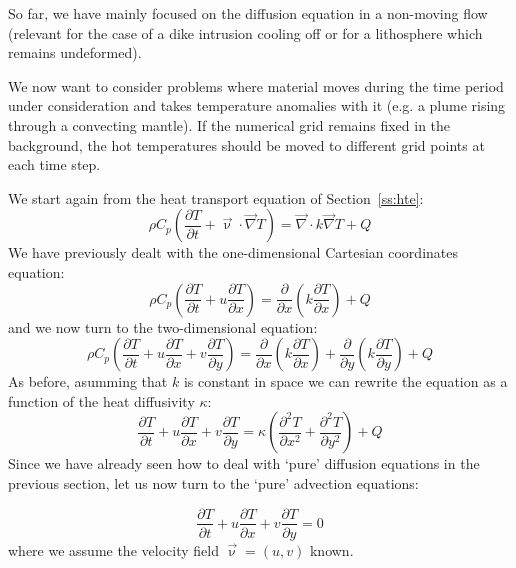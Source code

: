 
So far, we have mainly focused on the diffusion equation in a non-moving flow 
(relevant for the case of a dike intrusion cooling off 
or for a lithosphere which remains undeformed). 

We now want to consider problems where material moves during the time period under 
consideration and takes temperature anomalies with it (e.g. a plume rising 
through a convecting mantle). 
If the numerical grid remains fixed in the background, the hot temperatures should 
be moved to different grid points at each time step. 

We start again from the heat transport equation of Section~\ref{ss:hte}:
\begin{equation}
\rho C_p \left( \frac{\partial T}{\partial t} + \vec\upnu \cdot \vec\nabla T  \right)=
\vec\nabla \cdot k \vec\nabla T + Q 
\end{equation}
We have previously dealt with the one-dimensional Cartesian coordinates equation:
\begin{equation}
\rho C_p \left( \frac{\partial T}{\partial t}  
+ u \frac{\partial T}{\partial x} \right)= 
\frac{\partial }{\partial x} \left(  k  \frac{\partial T}{\partial x} \right)+ Q
\end{equation}
and we now turn to the two-dimensional equation:
\begin{equation}
\rho C_p \left( \frac{\partial T}{\partial t}   
+ u \frac{\partial T}{\partial x}  
+ v \frac{\partial T}{\partial y} \right) 
=
\frac{\partial }{\partial x} \left(  k  \frac{\partial T}{\partial x} \right)
+
\frac{\partial }{\partial y} \left(  k  \frac{\partial T}{\partial y} \right)
+Q
\end{equation}
As before, asumming that $k$ is constant in space we can rewrite the equation as 
a function of the heat diffusivity $\kappa$:
\begin{equation}
\frac{\partial T}{\partial t}   
+ u \frac{\partial T}{\partial x}  
+ v \frac{\partial T}{\partial y} 
=
\kappa \left( 
\frac{\partial^2 T}{\partial x^2} 
+ \frac{\partial^2 T}{\partial y^2} \right) +Q
\end{equation}
Since we have already seen how to deal with `pure' diffusion equations in the 
previous section, let us now turn to the `pure' advection equations:

\begin{equation}
\frac{\partial T}{\partial t}  + u \frac{\partial T}{\partial x} + v \frac{\partial T}{\partial y}= 0
\end{equation}
where we assume the velocity field $\vec\upnu=(u,v)$ known. 

